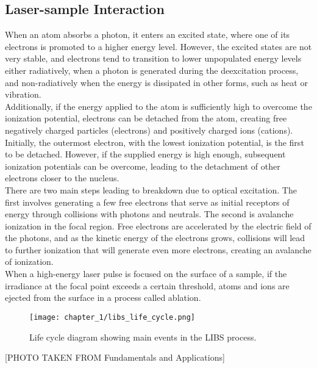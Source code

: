 \subsection{Laser-sample Interaction}
\label{subsec:laser-sample_int}

When an atom absorbs a photon, it enters an excited state, where one of its electrons is promoted to a higher energy level. However, the excited states are not very stable, and electrons tend to transition to lower unpopulated energy levels either radiatively, when a photon is generated during the deexcitation process, and non-radiatively when the energy is dissipated in other forms, such as heat or vibration.
\\
Additionally, if the energy applied to the atom is sufficiently high to overcome the ionization potential, electrons can be detached from the atom, creating free negatively charged particles (electrons) and positively charged ions (cations). Initially, the outermost electron, with the lowest ionization potential, is the first to be detached. However, if the supplied energy is high enough, subsequent ionization potentials can be overcome, leading to the detachment of other electrons closer to the nucleus.
\\
There are two main steps leading to breakdown due to optical excitation. The first involves generating a few free electrons that serve as initial receptors of energy through collisions with photons and neutrals. The second is avalanche ionization in the focal region. Free electrons are accelerated by the electric field of the photons, and as the kinetic energy of the electrons grows, collisions will lead to further ionization that will generate even more electrons, creating an avalanche of ionization. 
\\
When a high-energy laser pulse is focused on the surface of a sample, if the irradiance at the focal point exceeds a certain threshold, atoms and ions are ejected from the surface in a process called ablation.

\begin{figure}[H]
    \centering
    \texttt{[image: chapter\_1/libs\_life\_cycle.png]}
    \caption[LIBS life cycle.]{ Life cycle diagram showing main events in the LIBS process.}
    \label{fig:libs_life_cycle}
\end{figure}
[PHOTO TAKEN FROM Fundamentals and Applications]

